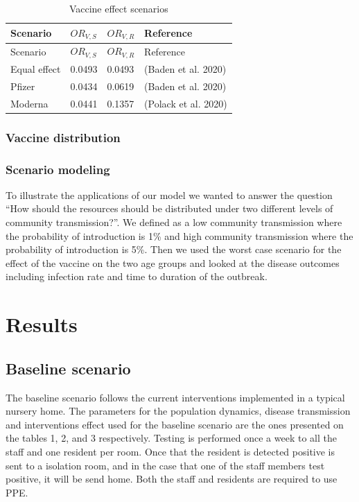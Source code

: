 \documentclass[
]{article}
\begin{document}
\begin{longtable}[]{@{}llll@{}}
\caption{Vaccine effect scenarios}\tabularnewline
\toprule
Scenario & \(OR_{V,S}\) & \(OR_{V,R}\) & Reference\tabularnewline
\midrule
\endfirsthead
\toprule
Scenario & \(OR_{V,S}\) & \(OR_{V,R}\) & Reference\tabularnewline
\midrule
\endhead
Equal effect & 0.0493 & 0.0493 & (Baden et al. 2020)\tabularnewline
Pfizer & 0.0434 & 0.0619 & (Baden et al. 2020)\tabularnewline
Moderna & 0.0441 & 0.1357 & (Polack et al. 2020)\tabularnewline
\bottomrule
\end{longtable}

\hypertarget{vaccine-distribution}{%
\subsubsection{Vaccine distribution}\label{vaccine-distribution}}

\hypertarget{scenario-modeling}{%
\subsubsection{Scenario modeling}\label{scenario-modeling}}

To illustrate the applications of our model we wanted to answer the
question ``How should the resources should be distributed under two
different levels of community transmission?''. We defined as a low
community transmission where the probability of introduction is 1\% and
high community transmission where the probability of introduction is
5\%. Then we used the worst case scenario for the effect of the vaccine
on the two age groups and looked at the disease outcomes including
infection rate and time to duration of the outbreak.

\hypertarget{results}{%
\section{Results}\label{results}}

\hypertarget{baseline-scenario}{%
\subsection{Baseline scenario}\label{baseline-scenario}}

The baseline scenario follows the current interventions implemented in a
typical nursery home. The parameters for the population dynamics,
disease transmission and interventions effect used for the baseline
scenario are the ones presented on the tables 1, 2, and 3 respectively.
Testing is performed once a week to all the staff and one resident per
room. Once that the resident is detected positive is sent to a isolation
room, and in the case that one of the staff members test positive, it
will be send home. Both the staff and residents are required to use PPE.
\end{document}
